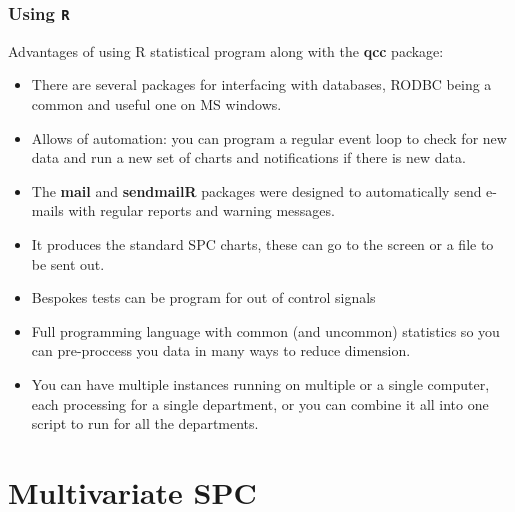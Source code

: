 \documentclass[MASTER-SPC.tex]{subfiles}
\begin{document}
	\subsection{Using \texttt{R}}
	{
		\large
		Advantages of using R statistical program along with the \textbf{qcc} package:
		\begin{itemize}
			\item There are several packages for interfacing with databases, RODBC being a common and useful one on MS windows.
			\item Allows of automation: you can program a regular event loop to check for new data and run a new set of charts and notifications if there is new data.
			\item The \textbf{mail} and \textbf{sendmailR} packages were designed to automatically send e-mails with regular reports and warning messages.
			\item It produces the standard SPC charts, these can go to the screen or a file to be sent out.
			\item Bespokes tests can be program for out of control signals
			\item Full programming language with common (and uncommon) statistics so you can pre-proccess you data in many ways to reduce dimension.
			\item You can have multiple instances running on multiple or a single computer, each processing for a single department, or you can combine it all into one script to run for all the departments.
		\end{itemize}
	}
	
	
	
	
	
	

\chapter{Multivariate SPC}
\end{document}
